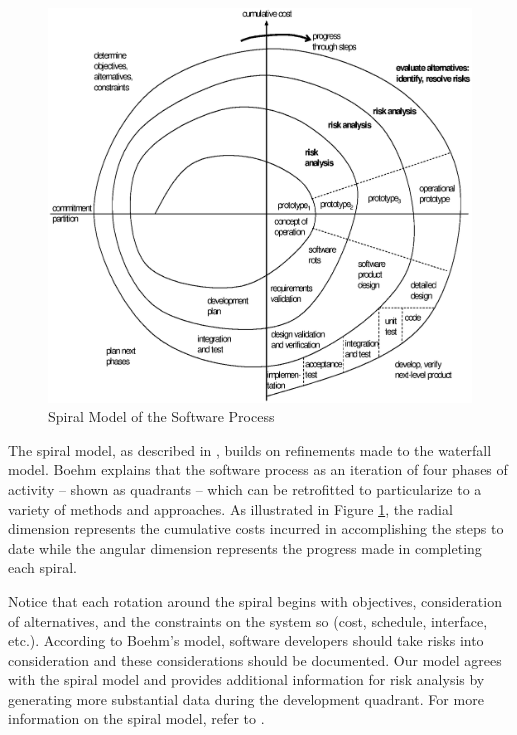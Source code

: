\begin{figure}[t]
\begin{center}
\includegraphics[scale=0.66]{images/spiral.eps}
\end{center}
\caption{Spiral Model of the Software Process}
\label{fig:spiral}
\end{figure}

The spiral model, as described in \cite{Boehm1986}, builds on refinements made
to the waterfall model. Boehm explains that the software process as an iteration
of four phases of activity -- shown as quadrants -- which can be retrofitted to
particularize to a variety of methods and approaches. As illustrated in Figure
\ref{fig:spiral}, the radial dimension represents the cumulative costs incurred
in accomplishing the steps to date while the angular dimension represents the
progress made in completing each spiral.

Notice that each rotation around the spiral begins with objectives,
consideration of alternatives, and the constraints on the system so (cost,
schedule, interface, etc.). According to Boehm's model, software developers
should take risks into consideration and these considerations should be
documented. Our model agrees with the spiral model and provides additional
information for risk analysis by generating more substantial data during the
development quadrant. For more information on the spiral model, refer to
\cite{Boehm1986}.
